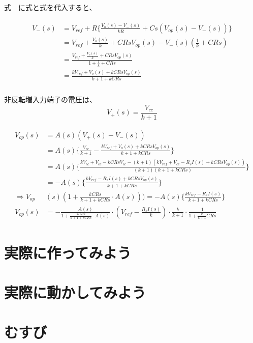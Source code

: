 \documentclass{ltjsarticle}
\begin{document}
式　に式と式を代入すると、

\begin{gather*}
    \begin{aligned}
        V_{-}(s) &= V_{ref} + R\{\frac{V_{o}(s) - V_{-}(s)}{kR} + Cs(V_{op}(s) - V_{-}(s))\} \\
        &= V_{ref} + \frac{V_{o}(s)}{k} + CRsV_{op}(s) - V_{-}(s)(\frac{1}{k} + CRs) \\
        &=\frac{V_{ref} + \frac{V_{o}(s)}{k} + CRsV_{op}(s)}{1+\frac{1}{k}+CRs} \\
        &=\frac{kV_{ref}+V_{o}(s)+kCRsV_{op}(s)}{k+1+kCRs} \\
    \end{aligned}
\end{gather*}

非反転増入力端子の電圧は、
\begin{equation}
    V_{+}(s) = \frac{V_{cc}}{k+1}
\end{equation}

\begin{gather*}
    \begin{aligned}
        V_{op}(s) &= A(s)(V_{+}(s)-V_{-}(s)) \\
        &= A(s)\{\frac{V_{cc}}{k+1} - \frac{kV_{ref}+V_{o}(s)+kCRsV_{op}(s)}{k+1+kCRs} \} \\
        &= A(s)\{\frac{kV_{cc}+V_{cc}-kCRsV_{cc}-(k+1)(kV_{ref}+V_{cc}-R_{s}I(s)+kCRsV_{op}(s))}{(k+1)(k+1+kCRs)}\} \\
        &= -A(s)\{\frac{kV_{ref}-R_{s}I(s)+kCRsV_{op}(s)}{k+1+kCRs} \} \\
        \Rightarrow V_{op}&(s)(1+\frac{kCRs}{k+1+kCRs} \cdot A(s))) = -A(s)\{\frac{kV_{ref}-R_{s}I(s)}{k+1+kCRs} \} \\
        V_{op}(s) &= - \frac{A(s)}{1+\frac{kCRs}{k+1+kCRs} \cdot A(s)} \cdot (V_{ref}-\frac{R_{s}I(s)}{k}) \cdot \frac{k}{k+1} \cdot \frac{1}{1+\frac{k}{k+1}CRs}
    \end{aligned}
\end{gather*}


\section{実際に作ってみよう}


\section{実際に動かしてみよう}


\section{むすび}
\end{document}
